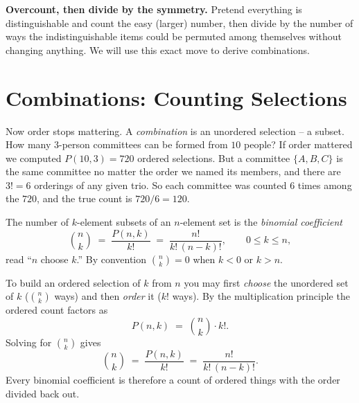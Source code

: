 \begin{intuitionbox}
\textbf{Overcount, then divide by the symmetry.} Pretend everything is distinguishable and count the easy (larger) number, then divide by
the number of ways the indistinguishable items could be permuted among themselves without
changing anything. We will use this exact move to derive combinations.
\end{intuitionbox}

\section{Combinations: Counting Selections}
\label{ch2:combinations}

Now order stops mattering. A \emph{combination} is an unordered selection -- a subset. How
many $3$-person committees can be formed from $10$ people? If order mattered we computed
$P(10,3) = 720$ ordered selections. But a committee $\{A,B,C\}$ is the same committee no
matter the order we named its members, and there are $3! = 6$ orderings of any given trio.
So each committee was counted $6$ times among the $720$, and the true count is $720/6 = 120$.

\begin{definition}
\label{ch2:def-binom}
The number of $k$-element subsets of an $n$-element set is the \emph{binomial coefficient}
\[
  \binom{n}{k} \;=\; \frac{P(n,k)}{k!} \;=\; \frac{n!}{k!\,(n-k)!}, \qquad 0 \le k \le n,
\]
read ``$n$ choose $k$.'' By convention $\binom{n}{k} = 0$ when $k < 0$ or $k > n$.
\end{definition}

\begin{whybox}
To build an ordered
selection of $k$ from $n$ you may first \emph{choose} the unordered set of $k$ ($\binom{n}{k}$
ways) and then \emph{order} it ($k!$ ways). By the multiplication principle the ordered count
factors as
\[
  P(n,k) \;=\; \binom{n}{k}\cdot k!.
\]
Solving for $\binom{n}{k}$ gives
\[
  \binom{n}{k} \;=\; \frac{P(n,k)}{k!} \;=\; \frac{n!}{k!\,(n-k)!}.
\]
Every binomial coefficient is
therefore a count of ordered things with the order divided back out.
\end{whybox}

